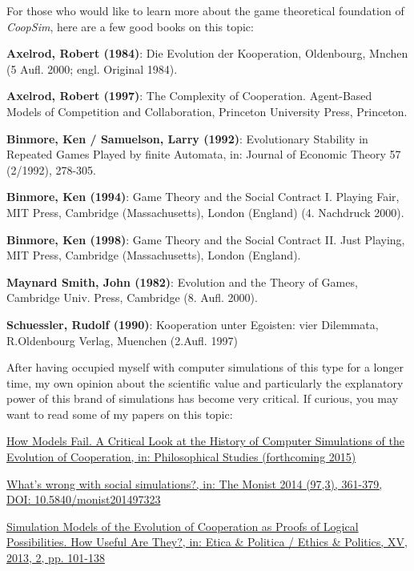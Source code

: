 \documentclass[12pt,a4paper,USenglish]{article}
\begin{document}
For those who would like to learn more about the game theoretical
foundation of {\em CoopSim}, here are a few good books on this
topic:

\setlength{\parindent}{0ex}
\setlength{\parskip}{2ex}

{\bf Axelrod, Robert (1984)}: Die Evolution der Kooperation,
Oldenbourg, Mnchen (5 Aufl. 2000; engl. Original 1984).

{\bf Axelrod, Robert (1997)}: The Complexity of Cooperation. Agent-Based Models of
Competition and Collaboration, Princeton University Press, Princeton.

{\bf Binmore, Ken / Samuelson, Larry (1992)}: Evolutionary Stability in
Repeated Games Played by finite Automata, in: Journal of Economic Theory 57
(2/1992), 278-305.

{\bf Binmore, Ken (1994)}: Game Theory and the Social Contract I. Playing
Fair, MIT Press, Cambridge (Massachusetts), London (England) (4. Nachdruck
2000).

{\bf Binmore, Ken (1998)}: Game Theory and the Social Contract II. Just
Playing, MIT Press, Cambridge (Massachusetts), London (England).

{\bf Maynard Smith, John (1982)}: Evolution and the Theory of Games, Cambridge
Univ. Press, Cambridge (8. Aufl. 2000).

{\bf Schuessler, Rudolf (1990)}: Kooperation unter Egoisten: vier Dilemmata,
R.Oldenbourg Verlag, Muenchen (2.Aufl. 1997)

After having occupied myself with computer simulations of this type for a
longer time, my own opinion about the scientific value and particularly the
explanatory power of this brand of simulations has become very critical.  If
curious, you may want to read some of my papers on this topic:

\href{http://www.eckhartarnold.de/papers/2015_How_Models_Fail/How_models_fail.html}{How
  Models Fail. A Critical Look at the History of Computer Simulations
  of the Evolution of Cooperation, in: Philosophical Studies (forthcoming 2015)}

\href{http://www.eckhartarnold.de/papers/2014_Social_Simulations/Whats_wrong_with_social_simulations.html}{What's
  wrong with social simulations?, in: The Monist 2014 (97,3), 361-379, DOI: 10.5840/monist201497323}

\href{http://www.eckhartarnold.de/papers/2013_Simulations_as_Logical_Possibilities/Arnold_2013_Simulations_as_Proofs_of_Logical_Possibilities.pdf}{Simulation  Models  of   the  Evolution  of   Cooperation  as Proofs of  Logical Possibilities. How Useful Are They?, in: Etica \& Politica
/ Ethics \& Politics, XV, 2013, 2, pp. 101-138}
\end{document}
